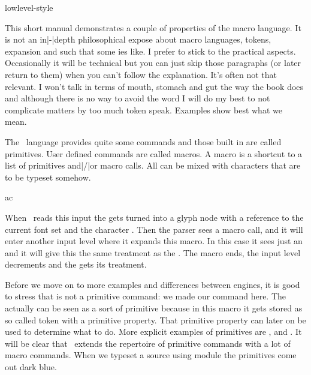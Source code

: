 


\environment lowlevel-style

\startdocument
  [title=expansion,
   color=middleyellow]

\startsection[title=Preamble]

This short manual demonstrates a couple of properties of the macro language. It
is not an in|-|depth philosophical expose about macro languages, tokens,
expansion and such that some \TEX ies like. I prefer to stick to the practical
aspects. Occasionally it will be technical but you can just skip those paragraphs
(or later return to them) when you can't follow the explanation. It's often not
that relevant. I won't talk in terms of mouth, stomach and gut the way the \TEX
book does and although there is no way to avoid the word  I will do
my best to not complicate matters by too much token speak. Examples show best
what we mean.

\stopsection

\startsection[title={\TEX\ primitives}]

The \TEX\ language provides quite some commands and those built in are called
primitives. User defined commands are called macros. A macro is a shortcut to a
list of primitives and|/|or macro calls. All can be mixed with characters that
are to be typeset somehow.

\starttyping[option=TEX]

a\MyMacro c
\stoptyping

When \TEX\ reads this input the  gets turned into a glyph node with a
reference to the current font set and the character . Then the parser
sees a macro call, and it will enter another input level where it expands this
macro. In this case it sees just an  and it will give this the same
treatment as the . The macro ends, the input level decrements and the
 gets its treatment.

Before we move on to more examples and differences between engines, it is good to
stress that \type {\MyMacro} is not a primitive command: we made our command
here. The  actually can be seen as a sort of primitive because in this
macro it gets stored as so called token with a primitive property. That primitive
property can later on be used to determine what to do. More explicit examples of
primitives are \type {\hbox}, \type {\advance} and \type {\relax}. It will be
clear that \CONTEXT\ extends the repertoire of primitive commands with a lot of
macro commands. When we typeset a source using module  the
primitives come out dark blue.

